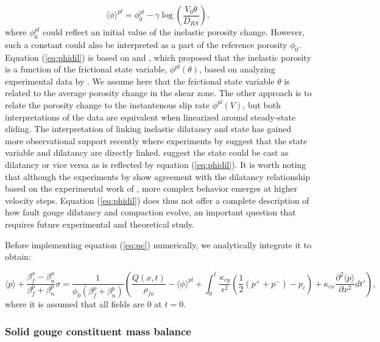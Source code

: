 \documentclass[draft]{agujournal2019}
\begin{document}
\begin{equation}
    \langle \phi \rangle^{pl} = \phi_0^{pl} -  \gamma \log \left( \frac{V_0 \theta}{D_{RS}} \right),
    \label{eq:phidil}
\end{equation}
where $\phi_0^{pl}$ could reflect an initial value of the inelastic porosity change. However, such a constant could also be interpreted as a part of the reference porosity $\phi_0$.
Equation (\ref{eq:phidil}) is based on  and , which proposed that the inelastic porosity is a function of the frictional state variable, $\phi^{pl} (\theta)$, based on analyzing experimental data by . We assume here that the frictional state variable $\theta$ is related to the average porosity change in the shear zone. The other approach is to relate the porosity change to the instantenous slip rate $\phi^{pl} (V)$, but both interpretations of the  data are equivalent when linearized around steady-state sliding. The interpretation of linking inelastic dilatancy and state has gained more observational support recently where experiments by  suggest that the state variable and dilatancy are directly linked.  suggest the state could be cast as dilatancy or vice versa as is reflected by equation (\ref{eq:phidil}). It is worth noting that although the experiments by  show agreement with the  dilatancy relationship based on the experimental work of , more complex behavior emerges at higher velocity steps. Equation (\ref{eq:phidil}) does thus not offer a complete description of how fault gouge dilatancy and compaction evolve, an important question that requires future experimental and theoretical study.

Before implementing equation (\ref{eq:pc}) numerically, we analytically integrate it to obtain:

\begin{equation}
      \langle {p} \rangle + \frac{\beta_f^\sigma - \beta_n^{\sigma}}{\beta_f^p + \beta_n^p } {\sigma}    = \frac{1}{\phi_0(\beta_f^p + \beta_n^p)} \left( \frac{{Q}(x,t)}{\rho_{fo}}  - \langle {\phi} \rangle^{pl} +  \int_0^t \frac{\kappa_{cy}}{\epsilon^2} (\frac{1}{2}(p^+ + p^-) - p_c) + \kappa_{cx} \frac{\partial^2 \langle p \rangle}{\partial x^2} dt' \right),
     \label{eq:pcI}
\end{equation}	
where it is assumed that all fields are 0 at $t=0$.

\subsubsection{Solid gouge constituent mass balance} \label{sec:solid}
\end{document}
